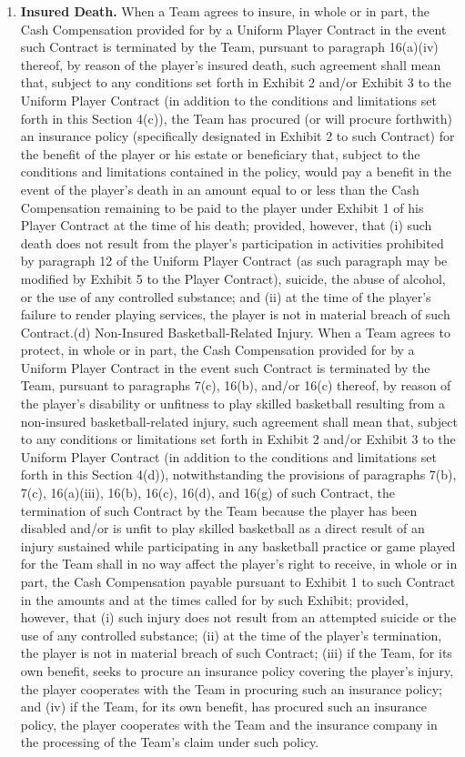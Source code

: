 \documentclass[
]{book}
\begin{document}
\begin{enumerate}
\item
  \textbf{Insured Death.} When a Team agrees to insure, in whole or in part, the Cash Compensation provided for by a Uniform Player Contract in the event such Contract is terminated by the Team, pursuant to paragraph 16(a)(iv) thereof, by reason of the player's insured death, such agreement shall mean that, subject to any conditions set forth in Exhibit 2 and/or Exhibit 3 to the Uniform Player Contract (in addition to the conditions and limitations set forth in this Section 4(c)), the Team has procured (or will procure forthwith) an insurance policy (specifically designated in Exhibit 2 to such Contract) for the benefit of the player or his estate or beneficiary that, subject to the conditions and limitations contained in the policy, would pay a benefit in the event of the player's death in an amount equal to or less than the Cash Compensation remaining to be paid to the player under Exhibit 1 of his Player Contract at the time of his death; provided, however, that (i) such death does not result from the player's participation in activities prohibited by paragraph 12 of the Uniform Player Contract (as such paragraph may be modified by Exhibit 5 to the Player Contract), suicide, the abuse of alcohol, or the use of any controlled substance; and (ii) at the time of the player's failure to render playing services, the player is not in material breach of such Contract.(d) Non-Insured Basketball-Related Injury. When a Team agrees to protect, in whole or in part, the Cash Compensation provided for by a Uniform Player Contract in the event such Contract is terminated by the Team, pursuant to paragraphs 7(c), 16(b), and/or 16(c) thereof, by reason of the player's disability or unfitness to play skilled basketball resulting from a non-insured basketball-related injury, such agreement shall mean that, subject to any conditions or limitations set forth in Exhibit 2 and/or Exhibit 3 to the Uniform Player Contract (in addition to the conditions and limitations set forth in this Section 4(d)), notwithstanding the provisions of paragraphs 7(b), 7(c), 16(a)(iii), 16(b), 16(c), 16(d), and 16(g) of such Contract, the termination of such Contract by the Team because the player has been disabled and/or is unfit to play skilled basketball as a direct result of an injury sustained while participating in any basketball practice or game played for the Team shall in no way affect the player's right to receive, in whole or in part, the Cash Compensation payable pursuant to Exhibit 1 to such Contract in the amounts and at the times called for by such Exhibit; provided, however, that (i) such injury does not result from an attempted suicide or the use of any controlled substance; (ii) at the time of the player's termination, the player is not in material breach of such Contract; (iii) if the Team, for its own benefit, seeks to procure an insurance policy covering the player's injury, the player cooperates with the Team in procuring such an insurance policy; and (iv) if the Team, for its own benefit, has procured such an insurance policy, the player cooperates with the Team and the insurance company in the processing of the Team's claim under such policy.

\end{enumerate}
\end{document}

